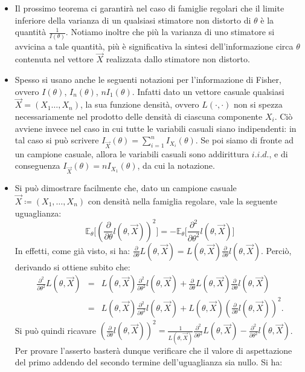 \begin{itemize}
\item Il prossimo teorema ci garantirà nel caso di famiglie regolari che il limite inferiore della varianza di un qualsiasi stimatore non distorto di $\theta$ è la quantità $\frac{1}{I(\theta)}$. Notiamo inoltre che più la varianza di uno stimatore si avvicina a tale quantità, più è significativa la sintesi dell'informazione circa $\theta$ contenuta nel vettore $\vec{X}$ realizzata dallo stimatore non distorto.
\item Spesso si usano anche le seguenti notazioni per l'informazione di Fisher, ovvero $I(\theta)$, $I_n(\theta)$, $nI_1(\theta)$. Infatti dato un vettore casuale qualsiasi $\vec{X}=(X_1\ldots,X_n)$, la sua funzione densità, ovvero $L(\cdot,\cdot)$ non si spezza necessariamente nel prodotto delle densità di ciascuna componente $X_i$. Ciò avviene invece nel caso in cui tutte le variabili casuali siano indipendenti: in tal caso si può scrivere $I_{\vec{X}}(\theta)=\sum_{i=1}^n I_{X_i}(\theta)$. Se poi siamo di fronte ad un campione casuale, allora le variabili casuali sono addirittura $i.i.d.$, e di conseguenza $I_{\vec{X}}(\theta)=nI_{X_1}(\theta)$, da cui la notazione.
\item Si può dimostrare facilmente che, dato un campione casuale $\vec{X}\coloneqq (X_1,\ldots,X_n)$ con densità nella famiglia regolare, vale la seguente uguaglianza: 
$$\mathbb{E}_\theta\Bigg[\left(\frac{\partial}{\partial\theta}l(\theta,\vec{X})\right)^2\Bigg]=-\mathbb{E}_\theta\Bigg[\frac{\partial^2}{\partial\theta^2}l(\theta,\vec{X})\Bigg]$$ 
In effetti, come già visto, si ha: $\frac{\partial}{\partial\theta}L(\theta,\vec{X})=L(\theta,\vec{X})\frac{\partial}{\partial\theta}l(\theta,\vec{X})$. Perciò, derivando si ottiene subito che:
\begin{eqnarray*}
\frac{\partial^2}{\partial\theta^2}L(\theta,\vec{X}) &=& L(\theta,\vec{X})\frac{\partial^2}{\partial\theta^2}l(\theta,\vec{X})+\frac{\partial}{\partial\theta}L(\theta,\vec{X})\frac{\partial}{\partial\theta}l(\theta,\vec{X})\\
&=& L(\theta,\vec{X})\frac{\partial^2}{\partial\theta^2}l(\theta,\vec{X})+L(\theta,\vec{X})\left(\frac{\partial}{\partial\theta}l(\theta,\vec{X})\right)^2.
\end{eqnarray*}
Si può quindi ricavare $\left(\frac{\partial}{\partial\theta}l(\theta,\vec{X})\right)^2=\frac{1}{L(\theta,\vec{X})}\frac{\partial^2}{\partial\theta^2}L(\theta,\vec{X})-\frac{\partial^2}{\partial\theta^2}l(\theta,\vec{X})$. Per provare l'asserto basterà dunque verificare che il valore di aspettazione del primo addendo del secondo termine dell'uguaglianza sia nullo. Si ha:

\end{itemize}
